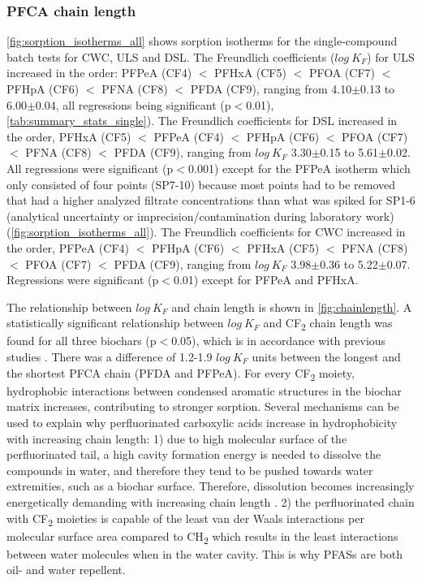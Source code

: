 \subsubsection{PFCA chain length}
\cref{fig:sorption_isotherms_all} shows sorption isotherms for the single-compound batch tests for CWC, ULS and DSL. The Freundlich coefficients ($log~K_F$) for ULS increased in the order: PFPeA (CF4) $<$ PFHxA (CF5) $<$ PFOA (CF7) $<$ PFHpA (CF6) $<$ PFNA (CF8) $<$ PFDA (CF9), ranging from 4.10$\pm$0.13 to 6.00$\pm$0.04, all regressions being significant (p$<$0.01), \cref{tab:summary_stats_single}). The Freundlich coefficients for DSL increased in the order, PFHxA (CF5) $<$ PFPeA (CF4) $<$ PFHpA (CF6) $<$ PFOA (CF7) $<$ PFNA (CF8) $<$ PFDA (CF9), ranging from $log~K_F$ 3.30$\pm$0.15 to 5.61$\pm$0.02. All regressions were significant (p$<$0.001) except for the PFPeA isotherm which only consisted of four points (SP7-10) because most points had to be removed that had a higher analyzed filtrate concentrations than what was spiked for SP1-6 (analytical uncertainty or imprecision/contamination during laboratory work) (\cref{fig:sorption_isotherms_all}). The Freundlich coefficients for CWC increased in the order, PFPeA (CF4) $<$ PFHpA (CF6) $<$ PFHxA (CF5) $<$ PFNA (CF8) $<$ PFOA (CF7) $<$ PFDA (CF9), ranging from $log~K_F$ 3.98$\pm$0.36 to 5.22$\pm$0.07. Regressions were significant (p$<$0.01) except for PFPeA and PFHxA. 

The relationship between $log~K_F$ and chain length is shown in \cref{fig:chainlength}. A statistically significant relationship between $log~K_F$ and CF\textsubscript{2} chain length was found for all three biochars (p$<$0.05), which is in accordance with previous studies \citep{Sorengard2019, higgins2006sorption, ahmed2020per}. There was a difference of 1.2-1.9 $log~K_F$ units between the longest and the shortest PFCA chain (PFDA and PFPeA). For every CF\textsubscript{2} moiety, hydrophobic interactions between condensed aromatic structures in the biochar matrix increases, contributing to stronger sorption. Several mechanisms can be used to explain why perfluorinated carboxylic acids increase in hydrophobicity with increasing chain length: 1) due to high molecular surface of the perfluorinated tail, a high cavity formation energy is needed to dissolve the compounds in water, and therefore they tend to be pushed towards water extremities, such as a biochar surface. Therefore, dissolution becomes increasingly energetically demanding with increasing chain length \citep{sigmund2022sorption}. 2) the perfluorinated chain with CF\textsubscript{2} moieties is capable of the least van der Waals interactions per molecular surface area compared to CH\textsubscript{2} which results in the least interactions between water molecules when in the water cavity. This is why PFASs are both oil- and water repellent. 

